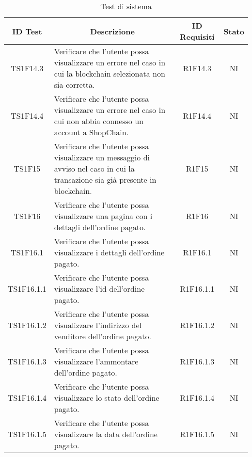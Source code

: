 \begin{table}[H]
  \centering
  \renewcommand{\arraystretch}{1.8}
  \begin{tabular}{c|p{8cm}|c|c}
    \rowcolor[HTML]{125E28}
    \color[HTML]{FFFFFF}\textbf{ID Test}
               & \multicolumn{1}{c}{\color[HTML]{FFFFFF}\textbf{Descrizione}}
               & \color[HTML]{FFFFFF}\textbf{ID Requisiti}
               & \color[HTML]{FFFFFF}\textbf{Stato}                                                                                                                      \\
    \hline
    TS1F14.3   & Verificare che l'utente possa visualizzare un errore nel caso in cui la blockchain\glo{} selezionata non sia corretta.                 & R1F14.3   & NI \\
    TS1F14.4   & Verificare che l'utente possa visualizzare un errore nel caso in cui non abbia connesso un account a ShopChain.                        & R1F14.4   & NI \\
    TS1F15     & Verificare che l'utente possa visualizzare un messaggio di avviso nel caso in cui la transazione sia già presente in blockchain\glo{}. & R1F15     & NI \\
    TS1F16     & Verificare che l'utente possa visualizzare una pagina con i dettagli dell'ordine pagato.                                               & R1F16     & NI \\
    TS1F16.1   & Verificare che l'utente possa visualizzare i dettagli dell'ordine pagato.                                                              & R1F16.1   & NI \\
    TS1F16.1.1 & Verificare che l'utente possa visualizzare l'id dell'ordine pagato.                                                                    & R1F16.1.1 & NI \\
    TS1F16.1.2 & Verificare che l'utente possa visualizzare l'indirizzo del venditore dell'ordine pagato.                                               & R1F16.1.2 & NI \\
    TS1F16.1.3 & Verificare che l'utente possa visualizzare l'ammontare dell'ordine pagato.                                                             & R1F16.1.3 & NI \\
    TS1F16.1.4 & Verificare che l'utente possa visualizzare lo stato dell'ordine pagato.                                                                & R1F16.1.4 & NI \\
    TS1F16.1.5 & Verificare che l'utente possa visualizzare la data dell'ordine pagato.                                                                 & R1F16.1.5 & NI \\
  \end{tabular}
  \caption{Test di sistema}
\end{table}

